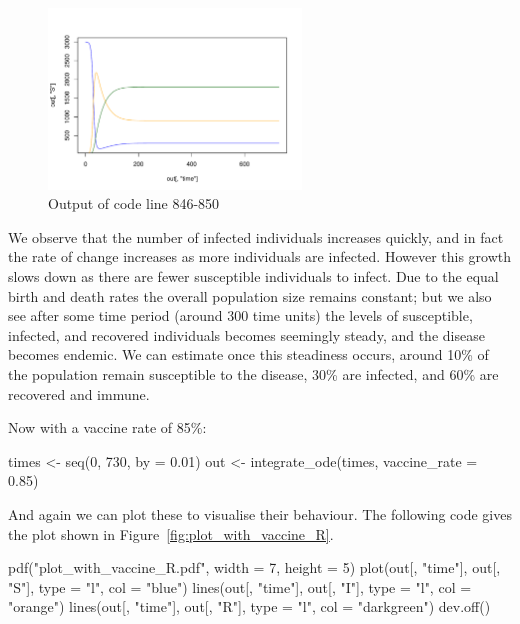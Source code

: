 \begin{figure}
\begin{center}
\includegraphics[width=0.6\textwidth]{./assets/plot_no_vaccine_R.pdf}
\end{center}
\caption{Output of code line 846-850}
\label{fig:plot_no_vaccine_R}
\end{figure}

We observe that the number of infected individuals increases quickly, and in
fact the rate of change increases as more individuals are infected. However
this growth slows down as there are fewer susceptible individuals to infect. Due
to the equal birth and death rates the overall population size remains constant;
but we also see after some time period (around 300 time units) the levels of
susceptible, infected, and recovered individuals becomes seemingly steady, and
the disease becomes endemic. We can estimate once this steadiness occurs, around
10\% of the population remain susceptible to the disease, 30\% are infected, and
60\% are recovered and immune.

Now with a vaccine rate of 85\%:

\begin{Rin}
times <- seq(0, 730, by = 0.01)
out <- integrate_ode(times, vaccine_rate = 0.85)
\end{Rin}

And again we can plot these to visualise their behaviour. The following code
gives the plot shown in Figure~\ref{fig:plot_with_vaccine_R}.

\begin{Rin-no-test}
pdf("plot_with_vaccine_R.pdf", width = 7, height = 5) 
plot(out[, "time"], out[, "S"], type = "l", col = "blue")
lines(out[, "time"], out[, "I"], type = "l", col = "orange")
lines(out[, "time"], out[, "R"], type = "l", col = "darkgreen")
dev.off()
\end{Rin-no-test}


